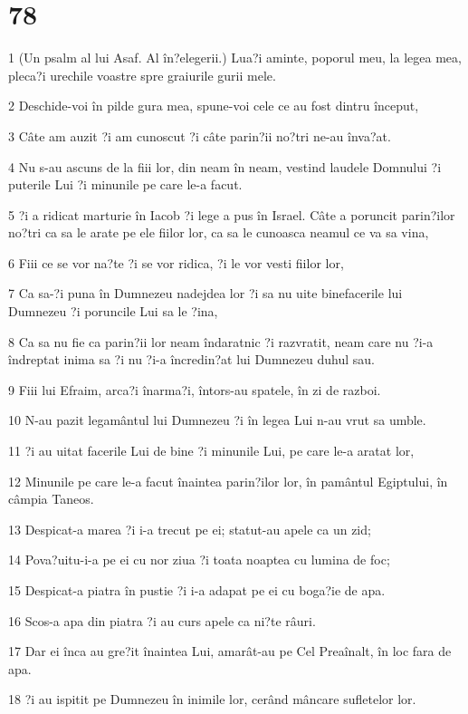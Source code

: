 \chapter{78}

\par 1 (Un psalm al lui Asaf. Al în?elegerii.) Lua?i aminte, poporul meu, la legea mea, pleca?i urechile voastre spre graiurile gurii mele.
\par 2 Deschide-voi în pilde gura mea, spune-voi cele ce au fost dintru început,
\par 3 Câte am auzit ?i am cunoscut ?i câte parin?ii no?tri ne-au înva?at.
\par 4 Nu s-au ascuns de la fiii lor, din neam în neam, vestind laudele Domnului ?i puterile Lui ?i minunile pe care le-a facut.
\par 5 ?i a ridicat marturie în Iacob ?i lege a pus în Israel. Câte a poruncit parin?ilor no?tri ca sa le arate pe ele fiilor lor, ca sa le cunoasca neamul ce va sa vina,
\par 6 Fiii ce se vor na?te ?i se vor ridica, ?i le vor vesti fiilor lor,
\par 7 Ca sa-?i puna în Dumnezeu nadejdea lor ?i sa nu uite binefacerile lui Dumnezeu ?i poruncile Lui sa le ?ina,
\par 8 Ca sa nu fie ca parin?ii lor neam îndaratnic ?i razvratit, neam care nu ?i-a îndreptat inima sa ?i nu ?i-a încredin?at lui Dumnezeu duhul sau.
\par 9 Fiii lui Efraim, arca?i înarma?i, întors-au spatele, în zi de razboi.
\par 10 N-au pazit legamântul lui Dumnezeu ?i în legea Lui n-au vrut sa umble.
\par 11 ?i au uitat facerile Lui de bine ?i minunile Lui, pe care le-a aratat lor,
\par 12 Minunile pe care le-a facut înaintea parin?ilor lor, în pamântul Egiptului, în câmpia Taneos.
\par 13 Despicat-a marea ?i i-a trecut pe ei; statut-au apele ca un zid;
\par 14 Pova?uitu-i-a pe ei cu nor ziua ?i toata noaptea cu lumina de foc;
\par 15 Despicat-a piatra în pustie ?i i-a adapat pe ei cu boga?ie de apa.
\par 16 Scos-a apa din piatra ?i au curs apele ca ni?te râuri.
\par 17 Dar ei înca au gre?it înaintea Lui, amarât-au pe Cel Preaînalt, în loc fara de apa.
\par 18 ?i au ispitit pe Dumnezeu în inimile lor, cerând mâncare sufletelor lor.
